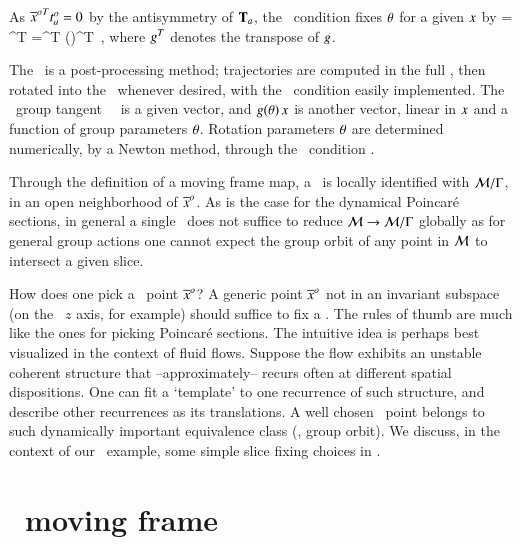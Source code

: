 As ${\overline{x}^o}^T t^o_{a} =0$ by the antisymmetry of
$\mathbf{T}_a$, the \slice\ condition  fixes
${\bf \theta}$ for a given $x$ by
 = \sspRed^T  
	=\ssp^T  \LieEl(\gSpace)^T 
\,,
where $g^T$ denotes the transpose of $g$.



The \mframes\ is a post-processing method; trajectories are
computed in the full \statesp, then rotated into the \slice\
whenever desired, with the \slice\ condition easily
implemented. The \slice\ group tangent \sliceTan\ \, is a given
vector, and $g({\bf \theta})\,x$ is
another vector, linear in $x$ and a function of group
parameters ${\bf \theta}$. Rotation parameters ${\bf \theta}$ are
determined numerically, by a Newton method, through the \slice\
condition .


Through the definition of a moving frame map, a \slice\ is
locally identified with ${\cal M}/\Gamma$, in an open
neighborhood of ${\overline{x}^o}$. As is the case for the dynamical
Poincar\'e sections, in general a single \slice\ does not
suffice to reduce ${\cal M} \to {\cal M}/\Gamma$ globally as
for general group actions one cannot expect the group orbit
of any point in ${\cal M}$ to intersect a given slice.

How does one pick a \slice\ point ${\overline{x}^o}$? A generic point
${\overline{x}^o} $ not in an invariant subspace (on the \cLe\ $z$
axis, for example) should suffice to fix a \slice.
The rules of thumb are much like the ones for picking
Poincar\'e sections. The intuitive
idea is perhaps best visualized in the context of fluid
flows. Suppose the flow exhibits an unstable coherent
structure that --approximately-- recurs often at different
spatial dispositions. One can fit a `template' to one
recurrence of such structure, and describe other recurrences
as its translations. A well chosen \slice\ point belongs to
such dynamically important equivalence class (\ie, group
orbit).
We discuss, in the context of our \cLe\ example, some simple slice fixing
choices in \refsects{s:cleCoordSlice}{s:mfReqb}.


\section{\label{sec:CLeMovFr}\CLe\ moving frame}

